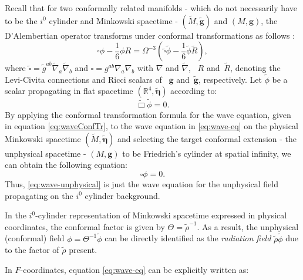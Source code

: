 Recall that for two conformally related manifolds - which do not necessarily have to be the $i^0$ cylinder and Minkowski spacetime - $(\tilde{M},\tilde{\boldsymbol{g}})$ and $(M,\boldsymbol{g})$, the D'Alembertian operator
transforms under conformal transformations as follows \cite{DuaFenGasHil22}:
\begin{equation}\label{eq:waveConfTr}
	\square \phi-\frac{1}{6} \phi R=\Omega^{-3}\left(\tilde{\square} \tilde{\phi}-\frac{1}{6} \tilde{\phi} \tilde{R}\right),
\end{equation}
where $\tilde{\square}=\tilde{g}^{ab}\tilde{\nabla}_a\tilde{\nabla}_b$ and $\square=g^{ab}\nabla_a\nabla_b$ with $\nabla$ and $\tilde{\nabla}$, ~$R$ and~$\tilde{R}$,
denoting the Levi-Civita connections and Ricci scalars of ~$\boldsymbol{g}$ and~$\tilde{\boldsymbol{g}}$, respectively.  Let $\tilde{\phi}$ be a scalar propagating in
flat spacetime $(\mathbb{R}^4, \tilde{\boldsymbol{\eta}})$ according to:
\begin{equation}\label{eq:wave-eq}
	\tilde{\Box} \tilde{\phi} = 0.
\end{equation}
By applying the conformal transformation formula for the wave equation, given in equation \eqref{eq:waveConfTr}, to the wave equation in \eqref{eq:wave-eq} on the physical Minkowski spacetime $(\tilde{M} , \tilde{\boldsymbol{\eta}})$ and selecting the target conformal extension - the unphysical spacetime - $(M, \boldsymbol{g})$ to be Friedrich's cylinder at spatial infinity, we can obtain the following equation:
\begin{equation}\label{eq:wave-unphysical}
	\square \phi = 0.
\end{equation}
Thus, \eqref{eq:wave-unphysical} is just the wave equation for the unphysical field propagating on the $i^0$ cylinder background.
\pagebreak
\begin{remark}
  In the $i^0$-cylinder representation of Minkowski spacetime expressed in physical coordinates, the conformal factor is given by $\Theta=\tilde{\rho}^{-1}$. As a result, the unphysical (conformal) field $\phi=\Theta^{-1}\tilde{\phi}$ can be directly identified as the \emph{radiation field} $\tilde{\rho}\tilde{\phi}$ due to the factor of $\tilde{\rho}$ present.
\end{remark}

\noindent In $F$-coordinates, equation \eqref{eq:wave-eq} can be explicitly written as:

